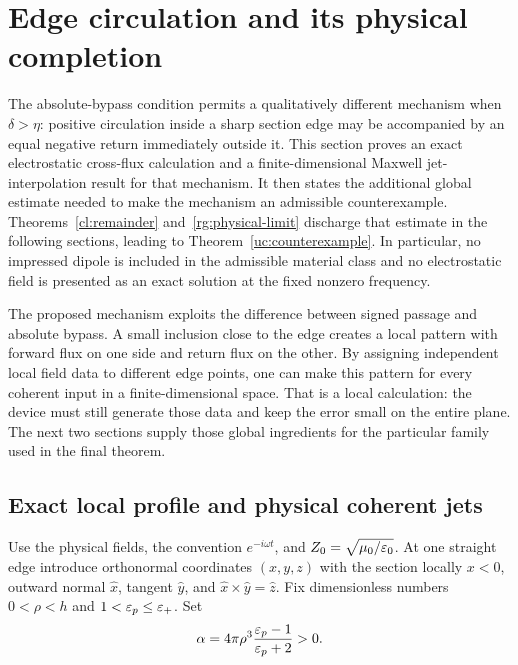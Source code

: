 \section{Edge circulation and its physical completion}
\label{ct:section}

The absolute-bypass condition permits a qualitatively different mechanism
when $\delta>\eta$: positive circulation inside a sharp section edge may
be accompanied by an equal negative return immediately outside it. This
section proves an exact electrostatic cross-flux calculation and a
finite-dimensional Maxwell jet-interpolation result for that mechanism.
It then states the additional global estimate needed to make the
mechanism an admissible counterexample. Theorems~\ref{cl:remainder}
and~\ref{rg:physical-limit} discharge that estimate in the following
sections, leading to Theorem~\ref{uc:counterexample}.
In particular, no impressed dipole is included in the admissible material
class and no electrostatic field is presented as an exact solution at the
fixed nonzero frequency.

The proposed mechanism exploits the difference between signed passage and
absolute bypass. A small inclusion close to the edge creates a local pattern
with forward flux on one side and return flux on the other. By assigning
independent local field data to different edge points, one can make this
pattern for every coherent input in a finite-dimensional space. That is a
local calculation: the device must still generate those data and keep the
error small on the entire plane. The next two sections supply those global
ingredients for the particular family used in the final theorem.

\subsection{Exact local profile and physical coherent jets}

Use the physical fields, the convention $e^{-i\omega t}$, and
$Z_0=\sqrt{\mu_0/\varepsilon_0}$. At one straight edge introduce orthonormal
coordinates $(x,y,z)$ with the section locally $x<0$, outward normal
$\widehat x$, tangent $\widehat y$, and
$\widehat x\times\widehat y=\widehat z$. Fix dimensionless numbers
$0<\rho<h$ and $1<\varepsilon_p\leq\varepsilon_+$. Set
\begin{equation}\label{ct:alpha}
 \alpha=4\pi\rho^3\frac{\varepsilon_p-1}{\varepsilon_p+2}>0.
\end{equation}

